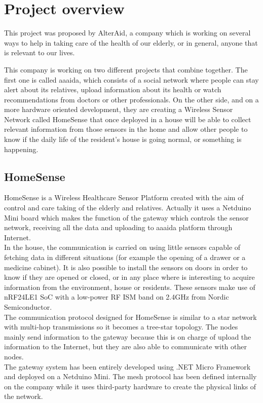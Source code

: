 \chapter{Project overview}\label{C:project-overview}
This project was proposed by AlterAid, a company which is working on several ways to help in taking care of the health of our elderly, or in general, anyone that is relevant to our lives.

This company is working on two different projects that combine together. The first one is called aaaida, which consists of a social network where people can stay alert about its relatives, upload information about its health or watch recommendations from doctors or other professionals. On the other side, and on a more hardware oriented development, they are creating a Wireless Sensor Network called HomeSense that once deployed in a house will be able to collect relevant information from those sensors in the home and allow other people to know if the daily life of the resident's house is going normal, or something is happening.

\section{HomeSense}\label{S:HomeSense}
HomeSense is a Wireless Healthcare Sensor Platform created with the aim of control and care taking of the elderly and relatives. Actually it uses a Netduino Mini board which makes the function of the gateway which controls the sensor network, receiving all the data and uploading to aaaida platform through Internet.
\\
In the house, the communication is carried on using little sensors capable of fetching data in different situations (for example the opening of a drawer or a medicine cabinet). It is also possible to install the sensors on doors in order to know if they are opened or closed, or in any place where is interesting to acquire information from the environment, house or residents. These sensors make use of nRF24LE1 \gls{SoC} with a low-power RF \gls{ISM} band on 2.4GHz from Nordic Semiconductor.
\\
The communication protocol designed for HomeSense is similar to a star network with multi-hop transmissions so it becomes a tree-star topology. The nodes mainly send information to the gateway because this is on charge of upload the information to the Internet, but they are also able to communicate with other nodes.
\\
The gateway system has been entirely developed using .NET Micro Framework and deployed on a Netduino Mini. The mesh protocol has been defined internally on the company while it uses third-party hardware to create the physical links of the network.

